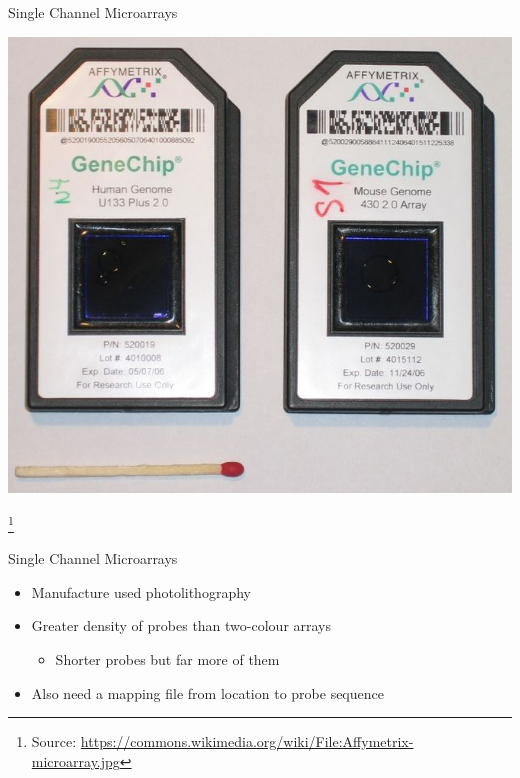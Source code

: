 \documentclass[aspectratio=169,11pt]{beamer}
\newcommand\blfootnote[1]{%
  \begingroup
  \renewcommand\thefootnote{}\footnote{#1}%
  \addtocounter{footnote}{-1}%
  \endgroup
}
\begin{document}
\begin{frame}{Single Channel Microarrays}

	\begin{center}
	\includegraphics[scale=0.25]{figures/Affymetrix.jpg} 
	\end{center}
	
	\blfootnote{Source: \url{https://commons.wikimedia.org/wiki/File:Affymetrix-microarray.jpg}}

\end{frame}


\begin{frame}{Single Channel Microarrays}

	\begin{itemize}
		\item Manufacture used photolithography
		\item Greater density of probes than two-colour arrays
		\begin{itemize}
			\item Shorter probes but far more of them
		\end{itemize}
		\item Also need a mapping file from location to probe sequence
	\end{itemize}

\end{frame}
\end{document}
